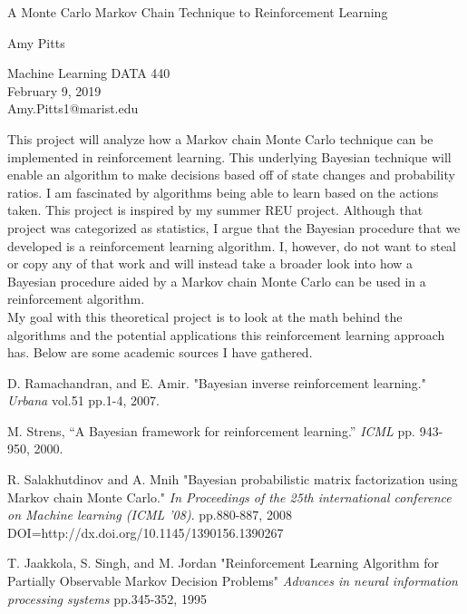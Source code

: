 \documentclass[a4paper]{article}
\begin{document}

\Large
 \begin{center}
A Monte Carlo Markov Chain Technique to Reinforcement Learning
\hspace{10pt}

\large
Amy Pitts
\\

\hspace{10pt}

\small 
Machine Learning DATA 440 \\ 
February 9, 2019 \\
Amy.Pitts1@marist.edu\\

\end{center}

\hspace{10pt}

\normalsize

\indent This project will analyze how a Markov chain Monte 
Carlo technique can be implemented in reinforcement learning. 
This underlying Bayesian technique will enable an algorithm 
to make decisions based off of state changes and probability 
ratios.  I am fascinated by algorithms being able to learn 
based on the actions taken. This project is inspired by my 
summer REU project. Although that project was categorized as 
statistics, I argue that the Bayesian procedure that we 
developed is a reinforcement learning algorithm.  I, however, 
do not want to steal or copy any of that work and will 
instead take a broader look into how a Bayesian procedure 
aided by a Markov chain Monte Carlo can be used in a 
reinforcement algorithm. \\
\indent My goal with this theoretical project is to look 
at the math behind the algorithms and the potential 
applications this reinforcement learning approach has.  
Below are some academic sources I have gathered. 


\begin{thebibliography}{9}
    D. Ramachandran, and E. Amir. "Bayesian inverse reinforcement 
    learning." \textit{Urbana}  vol.51 pp.1-4, 2007. 

    M. Strens, “A Bayesian framework for reinforcement learning.” 
    \textit{ICML} pp. 943-950, 2000. 

    R. Salakhutdinov and A. Mnih "Bayesian probabilistic matrix factorization 
    using Markov chain Monte Carlo." \textit{In Proceedings of the 25th 
    international conference on Machine learning (ICML '08)}. 
    pp.880-887, 2008 DOI=http://dx.doi.org/10.1145/1390156.1390267

    T. Jaakkola, S. Singh, and M. Jordan "Reinforcement Learning 
    Algorithm for Partially Observable Markov Decision Problems" 
    \textit{ Advances in neural information processing systems}
    pp.345-352, 1995



\end{thebibliography}
\end{document}
